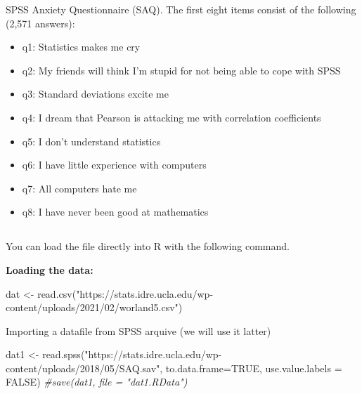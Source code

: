 \documentclass[
]{article}
\newenvironment{Shaded}{\begin{snugshade}}{\end{snugshade}}
\newcommand{\AttributeTok}[1]{\textcolor[rgb]{0.77,0.63,0.00}{#1}}
\newcommand{\CommentTok}[1]{\textcolor[rgb]{0.56,0.35,0.01}{\textit{#1}}}
\newcommand{\ConstantTok}[1]{\textcolor[rgb]{0.00,0.00,0.00}{#1}}
\newcommand{\FunctionTok}[1]{\textcolor[rgb]{0.00,0.00,0.00}{#1}}
\newcommand{\NormalTok}[1]{#1}
\newcommand{\OtherTok}[1]{\textcolor[rgb]{0.56,0.35,0.01}{#1}}
\newcommand{\StringTok}[1]{\textcolor[rgb]{0.31,0.60,0.02}{#1}}
\providecommand{\tightlist}{%
  \setlength{\itemsep}{0pt}\setlength{\parskip}{0pt}}
\begin{document}
SPSS Anxiety Questionnaire (SAQ). The first eight items consist of the
following (2,571 answers):

\begin{itemize}
\tightlist
\item
  q1: Statistics makes me cry
\item
  q2: My friends will think I'm stupid for not being able to cope with
  SPSS
\item
  q3: Standard deviations excite me
\item
  q4: I dream that Pearson is attacking me with correlation coefficients
\item
  q5: I don't understand statistics
\item
  q6: I have little experience with computers
\item
  q7: All computers hate me
\item
  q8: I have never been good at mathematics
\end{itemize}

\hypertarget{section}{%
\subsection*{}\label{section}}

You can load the file directly into R with the following command.

\textbf{Loading the data:}

\begin{Shaded}
\begin{Highlighting}[]
\NormalTok{dat }\OtherTok{\textless{}{-}} \FunctionTok{read.csv}\NormalTok{(}\StringTok{"https://stats.idre.ucla.edu/wp{-}content/uploads/2021/02/worland5.csv"}\NormalTok{)}
\end{Highlighting}
\end{Shaded}

Importing a datafile from SPSS arquive (we will use it latter)

\begin{Shaded}
\begin{Highlighting}[]
\NormalTok{dat1 }\OtherTok{\textless{}{-}} \FunctionTok{read.spss}\NormalTok{(}\StringTok{"https://stats.idre.ucla.edu/wp{-}content/uploads/2018/05/SAQ.sav"}\NormalTok{, }\AttributeTok{to.data.frame=}\ConstantTok{TRUE}\NormalTok{, }\AttributeTok{use.value.labels =} \ConstantTok{FALSE}\NormalTok{)}
\CommentTok{\#save(dat1, file = "dat1.RData")}
\end{Highlighting}
\end{Shaded}
\end{document}
